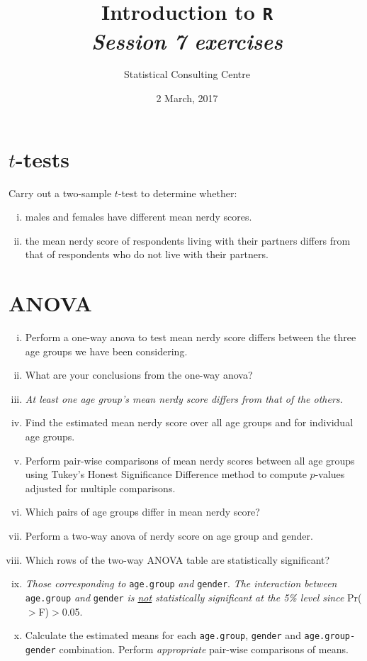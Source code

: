 \documentclass[12pt,a4paper]{article}\usepackage[]{graphicx}\usepackage[]{color}
\begin{document}
\setlength\parindent{0cm}
\title{\Large{\textbf{Introduction to \texttt{R}}}\\
\textit{Session 7 exercises}}
\author{Statistical Consulting Centre}
\date{2 March, 2017}
\maketitle
 
 
\section{$t$-tests} 
\label{sec:ttest}
Carry out a two-sample $t$-test to determine whether:
\begin{enumerate}[(i)]
\item males and females have different mean nerdy scores.
\item the mean nerdy score of respondents living with their partners differs from that of respondents who do not live with their partners.
\end{enumerate}


\section{ANOVA} 
\label{sec:anova}
\begin{enumerate}[(i)]
\item Perform a one-way anova to test mean nerdy score differs between the three age groups we have been considering.
\item What are your conclusions from the one-way anova?
\item[] {\em At least one age group's mean nerdy score differs from that of the others.}
\item Find the estimated mean nerdy score over all age groups and for individual age groups.
\item Perform pair-wise comparisons of mean nerdy scores between all age groups using Tukey's Honest Significance Difference method to compute $p$-values adjusted for multiple comparisons.
\item Which pairs of age groups differ in mean nerdy score?
\item Perform a two-way anova of nerdy score on age group and gender.
\item Which rows of the two-way ANOVA table are statistically significant? \item[] {\em Those corresponding to} \texttt{age.group} {\em and} \texttt{gender}. {\em The interaction between} \texttt{age.group} {\em and} \texttt{gender} {\em is \underline{not} statistically significant at the 5\% level since} Pr($>$F)$>$0.05.
\item Calculate the estimated means for each \texttt{age.group}, \texttt{gender} and \texttt{age.group-gender} combination. Perform {\em appropriate} pair-wise comparisons of means.
\end{enumerate}
\end{document}
